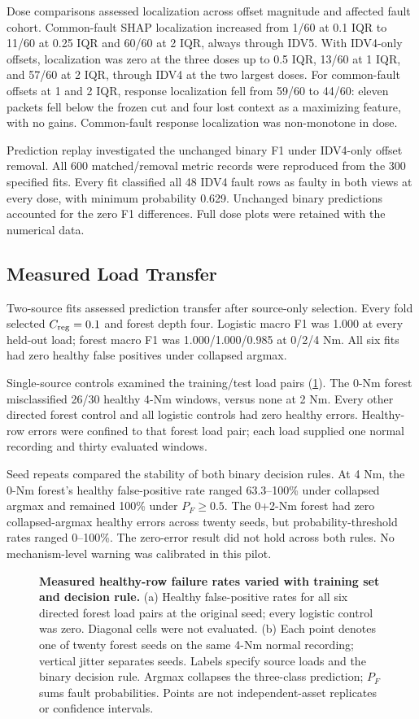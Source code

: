 \documentclass[conference]{IEEEtran}
\begin{document}
Dose comparisons assessed localization across offset magnitude and affected fault cohort. Common-fault SHAP localization increased from 1/60 at 0.1 IQR to 11/60 at 0.25 IQR and 60/60 at 2 IQR, always through IDV5. With IDV4-only offsets, localization was zero at the three doses up to 0.5 IQR, 13/60 at 1 IQR, and 57/60 at 2 IQR, through IDV4 at the two largest doses. For common-fault offsets at 1 and 2 IQR, response localization fell from 59/60 to 44/60: eleven packets fell below the frozen cut and four lost context as a maximizing feature, with no gains. Common-fault response localization was non-monotone in dose.

Prediction replay investigated the unchanged binary F1 under IDV4-only offset removal. All 600 matched/removal metric records were reproduced from the 300 specified fits. Every fit classified all 48 IDV4 fault rows as faulty in both views at every dose, with minimum probability 0.629. Unchanged binary predictions accounted for the zero F1 differences. Full dose plots were retained with the numerical data.

\subsection{Measured Load Transfer}
Two-source fits assessed prediction transfer after source-only selection. Every fold selected $C_{\rm reg}=0.1$ and forest depth four. Logistic macro F1 was 1.000 at every held-out load; forest macro F1 was 1.000/1.000/0.985 at 0/2/4 Nm. All six fits had zero healthy false positives under collapsed argmax.

Single-source controls examined the training/test load pairs (\cref{fig:measured-load}). The 0-Nm forest misclassified 26/30 healthy 4-Nm windows, versus none at 2 Nm. Every other directed forest control and all logistic controls had zero healthy errors. Healthy-row errors were confined to that forest load pair; each load supplied one normal recording and thirty evaluated windows.

Seed repeats compared the stability of both binary decision rules. At 4 Nm, the 0-Nm forest's healthy false-positive rate ranged 63.3--100\% under collapsed argmax and remained 100\% under $P_F\geq0.5$. The 0+2-Nm forest had zero collapsed-argmax healthy errors across twenty seeds, but probability-threshold rates ranged 0--100\%. The zero-error result did not hold across both rules. No mechanism-level warning was calibrated in this pilot.

\begin{figure}[!t]
\centering

\caption{\textbf{Measured healthy-row failure rates varied with training set and decision rule.} (a) Healthy false-positive rates for all six directed forest load pairs at the original seed; every logistic control was zero. Diagonal cells were not evaluated. (b) Each point denotes one of twenty forest seeds on the same 4-Nm normal recording; vertical jitter separates seeds. Labels specify source loads and the binary decision rule. Argmax collapses the three-class prediction; $P_F$ sums fault probabilities. Points are not independent-asset replicates or confidence intervals.}
\label{fig:measured-load}
\end{figure}
\end{document}
